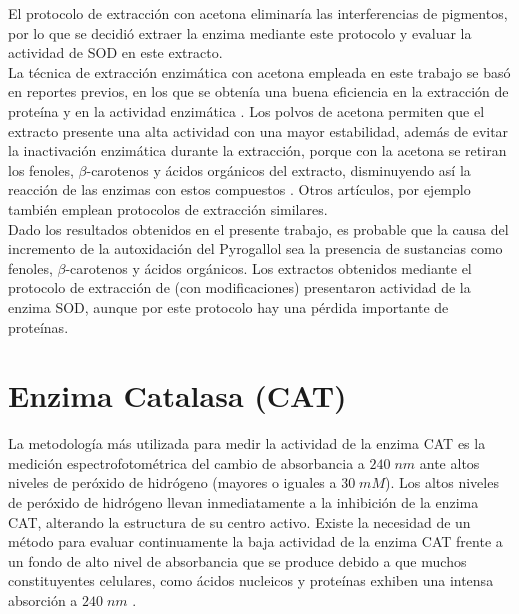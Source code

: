 El protocolo de extracción con acetona \citep{baquero2005catalase} eliminaría las interferencias de pigmentos, por lo que se decidi\'o extraer la enzima mediante este protocolo y evaluar la actividad de SOD en este extracto.\\

La técnica de extracción enzim\'atica con acetona  empleada en este trabajo se basó en reportes previos, en los que se obtenía una buena eficiencia en la extracción de proteína y en la actividad enzimática \citep{sala1999catalase,  narvaez2002evaluacion, camelo2004polifenoloxidasa}. Los polvos de acetona permiten que el extracto presente una alta actividad con una mayor estabilidad, además de evitar la inactivación enzimática durante la extracción, porque con la acetona se retiran los fenoles, $\beta$-carotenos y ácidos orgánicos del extracto, disminuyendo así la reacción de las enzimas con estos compuestos \citep{baquero2005catalase}. Otros art\'iculos, por ejemplo \cite{lopez2014actividad} tambi\'en emplean protocolos de extracci\'on similares. \\

Dado los resultados obtenidos en el presente trabajo, es probable que la causa del incremento de la autoxidaci\'on del Pyrogallol sea la presencia de sustancias como fenoles, $\beta$-carotenos y ácidos orgánicos. Los extractos obtenidos mediante el protocolo de extracci\'on de \cite{baquero2005catalase} (con modificaciones) presentaron actividad de la enzima SOD, aunque por este protocolo hay una p\'erdida importante de prote\'inas.\\


\section{Enzima Catalasa (CAT)}


La metodolog\'ia m\'as utilizada para medir la actividad de la enzima CAT es la medici\'on espectrofotom\'etrica del cambio de absorbancia a $240\;nm$ ante altos niveles de per\'oxido de hidr\'ogeno (mayores o iguales a $30\;mM$). Los altos niveles de per\'oxido de hidr\'ogeno llevan inmediatamente a la inhibici\'on de la enzima CAT, alterando la estructura de su centro activo. Existe la necesidad de un m\'etodo para evaluar continuamente la baja actividad de la enzima CAT frente a un fondo de alto nivel de absorbancia que se produce debido a que muchos constituyentes celulares, como \'acidos nucleicos y prote\'inas exhiben una intensa absorci\'on a $240\;nm$ \citep{hadwan2018simple}.\\

